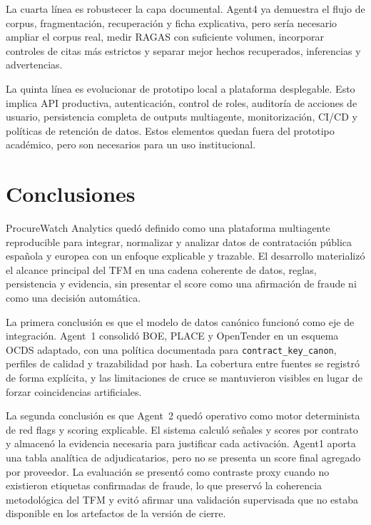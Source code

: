 \documentclass[11pt,a4paper,spanish]{book}
\numberwithin{equation}{chapter}
\numberwithin{figure}{chapter}
\begin{document}
La cuarta l{\'i}nea es robustecer la capa documental. Agent4 ya demuestra el flujo de corpus,
fragmentaci{\'o}n, recuperaci{\'o}n y ficha explicativa, pero ser{\'i}a necesario ampliar el corpus real,
medir RAGAS con suficiente volumen, incorporar controles de citas m{\'a}s estrictos y separar mejor
hechos recuperados, inferencias y advertencias.

La quinta l{\'i}nea es evolucionar de prototipo local a plataforma desplegable. Esto implica API
productiva, autenticaci{\'o}n, control de roles, auditor{\'i}a de acciones de usuario, persistencia
completa de outputs multiagente, monitorizaci{\'o}n, CI/CD y pol{\'i}ticas de retenci{\'o}n de datos.
Estos elementos quedan fuera del prototipo acad{\'e}mico, pero son necesarios para un uso institucional.

\chapter{Conclusiones}

ProcureWatch Analytics qued{\'o} definido como una plataforma multiagente reproducible para
integrar, normalizar y analizar datos de contrataci{\'o}n p{\'u}blica espa{\~n}ola y europea con un
enfoque explicable y trazable. El desarrollo materializ{\'o} el alcance principal del TFM en una cadena
coherente de datos, reglas, persistencia y evidencia, sin presentar el score como una afirmaci{\'o}n
de fraude ni como una decisi{\'o}n autom{\'a}tica.

La primera conclusi{\'o}n es que el modelo de datos can{\'o}nico funcion{\'o} como eje de integraci{\'o}n.
Agent~1 consolid{\'o} BOE, PLACE y OpenTender en un esquema OCDS adaptado, con una pol{\'i}tica
documentada para \texttt{contract\_key\_canon}, perfiles de calidad y trazabilidad por hash. La
cobertura entre fuentes se registr{\'o} de forma expl{\'i}cita, y las limitaciones de cruce se
mantuvieron visibles en lugar de forzar coincidencias artificiales.

La segunda conclusi{\'o}n es que Agent~2 qued{\'o} operativo como motor determinista de red flags y
scoring explicable. El sistema calcul{\'o} se{\~n}ales y scores por contrato y almacen{\'o} la evidencia
necesaria para justificar cada activaci{\'o}n. Agent1 aporta una tabla anal{\'i}tica de adjudicatarios,
pero no se presenta un score final agregado por proveedor. La evaluaci{\'o}n se
present{\'o} como contraste proxy cuando no existieron etiquetas confirmadas de fraude, lo que
preserv{\'o} la coherencia metodol{\'o}gica del TFM y evit{\'o} afirmar una validaci{\'o}n supervisada
que no estaba disponible en los artefactos de la versi{\'o}n de cierre.
\end{document}
